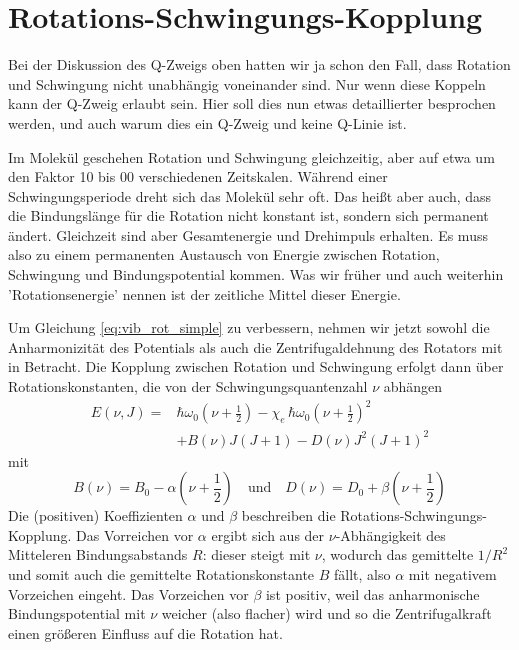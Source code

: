 \section{Rotations-Schwingungs-Kopplung}

Bei der Diskussion des Q-Zweigs oben hatten wir ja schon den Fall, dass Rotation und Schwingung nicht unabhängig voneinander sind. Nur wenn diese Koppeln kann der Q-Zweig erlaubt sein. Hier soll dies nun etwas detaillierter besprochen werden, und auch warum dies ein Q-Zweig und keine Q-Linie ist.

Im Molekül geschehen Rotation und Schwingung gleichzeitig, aber auf etwa um den Faktor 10 bis 00 verschiedenen Zeitskalen. Während einer Schwingungsperiode dreht sich das Molekül sehr oft. Das heißt aber auch, dass die Bindungslänge für die Rotation nicht konstant ist, sondern sich permanent ändert. Gleichzeit sind aber Gesamtenergie und Drehimpuls erhalten. Es muss also zu einem permanenten Austausch von Energie zwischen Rotation, Schwingung und Bindungspotential kommen. Was wir früher und auch weiterhin 'Rotationsenergie' nennen ist der zeitliche Mittel dieser Energie.

Um Gleichung \ref{eq:vib_rot_simple} zu verbessern, nehmen wir jetzt sowohl die Anharmonizität des Potentials als auch die Zentrifugaldehnung des Rotators mit in Betracht. Die Kopplung zwischen Rotation und Schwingung erfolgt dann über Rotationskonstanten, die von der Schwingungsquantenzahl $\nu$ abhängen
\begin{align}
 E(\nu, J) = & \hbar \omega_0 \left( \nu  + \frac{1}{2} \right)
 - \chi_e \, \hbar \omega_0  \left( \nu  + \frac{1}{2} \right)^2 \\
 & + B(\nu) J (J+1) - D(\nu) J^2 (J+1)^2  \nonumber
\end{align}
mit
\begin{equation}
B(\nu) = B_0 - \alpha \left(\nu + \frac{1}{2} \right) \quad \text{und} \quad
D(\nu) = D_0 + \beta \left(\nu + \frac{1}{2} \right) 
\end{equation}
Die (positiven) Koeffizienten $\alpha$ und $\beta$ beschreiben die  Rotations-Schwingungs-Kopplung. Das Vorreichen vor $\alpha$ ergibt sich aus der $\nu$-Abhängigkeit des Mitteleren Bindungsabstands $R$: dieser steigt mit $\nu$, wodurch das gemittelte $1/R^2$ und somit auch die gemittelte Rotationskonstante $B$ fällt, also $\alpha$ mit negativem Vorzeichen eingeht. Das Vorzeichen vor $\beta$ ist positiv, weil das anharmonische Bindungspotential mit $\nu$ weicher (also flacher) wird und so die Zentrifugalkraft einen größeren Einfluss auf die Rotation hat.

